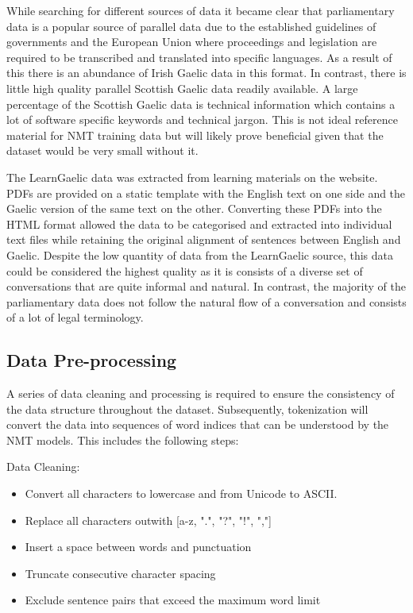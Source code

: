 While searching for different sources of data it became clear that parliamentary data is a popular source of parallel data due to the established guidelines of governments and the European Union where proceedings and legislation are required to be transcribed and translated into specific languages. As a result of this there is an abundance of Irish Gaelic data in this format.
In contrast, there is little high quality parallel Scottish Gaelic data readily available. A large percentage of the Scottish Gaelic data is technical information which contains a lot of software specific keywords and technical jargon. This is not ideal reference material for \acrshort{NMT} training data but will likely prove beneficial given that the dataset would be very small without it.

The LearnGaelic data was extracted from learning materials on the \cite{learn_gaelic_2019} website. PDFs are provided on a static template with the English text on one side and the Gaelic version of the same text on the other. Converting these PDFs into the HTML format allowed the data to be categorised and extracted into individual text files while retaining the original alignment of sentences between English and Gaelic.
Despite the low quantity of data from the LearnGaelic source, this data could be considered the highest quality as it is consists of a diverse set of conversations that are quite informal and natural. In contrast, the majority of the parliamentary data does not follow the natural flow of a conversation and consists of a lot of legal terminology.

\newpage
\subsection{Data Pre-processing}

A series of data cleaning and processing is required to ensure the consistency of the data structure throughout the dataset. Subsequently, tokenization will convert the data into sequences of word indices that can be understood by the \acrshort{NMT} models. This includes the following steps:

Data Cleaning:
\begin{itemize}
    \item Convert all characters to lowercase and from Unicode to ASCII. %
    \item Replace all characters outwith [a-z, ".", "?", "!", ","]
    \item Insert a space between words and punctuation
    \item Truncate consecutive character spacing
    \item Exclude sentence pairs that exceed the maximum word limit
\end{itemize}

